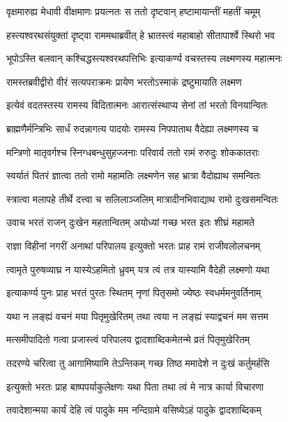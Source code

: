 \twolineshloka
{वृक्षमारुह्य मेधावी वीक्षमाणः प्रयत्नतः}
{स ततो दृष्टवान् हष्टामायान्तीं महतीं चमूम्} %

\twolineshloka
{हस्त्यश्वरथसंयुक्तां दृष्ट्वा राममथाब्रवीत्}
{हे भ्रातस्त्वं महाबाहो सीतापार्श्वे स्थिरो भव} %

\twolineshloka
{भूपोऽस्ति बलवान् कश्चिद्धस्त्यश्वरथपत्तिभिः}
{इत्याकर्ण्य वचस्तस्य लक्ष्मणस्य महात्मनः} %

\twolineshloka
{रामस्तब्रवीद्वीरो वीरं सत्यपराक्रमः}
{प्रायेण भरतोऽस्माकं द्रष्टुमायाति लक्ष्मण} %

\twolineshloka
{इत्येवं वदतस्तस्य रामस्य विदितात्मनः}
{आरात्संस्थाप्य सेनां तां भरतो विनयान्वितः} %

\twolineshloka
{ब्राह्मणैर्मन्त्रिभिः सार्धं रुदन्नागत्य पादयोः}
{रामस्य निपपाताथ वैदेह्या लक्ष्मणस्य च} %

\twolineshloka
{मन्त्रिणो मातृवर्गश्च स्निग्धबन्धुसुहज्जनाः}
{परिवार्य ततो रामं रुरुदुः शोककातराः} %

\twolineshloka
{स्वर्यातं पितरं ज्ञात्वा ततो रामो महामतिः}
{लक्ष्मणेन सह भ्रात्रा वैदोह्याथ समन्वितः} %

\twolineshloka
{स्त्रात्वा मलापहे तीर्थे दत्त्वा च सलिलाञ्जलिम्}
{मात्रादीनभिवाद्याथ रामो दुःखसमन्वितः} %

\twolineshloka
{उवाच भरतं राजन् दुःखेन महतान्वितम्}
{अयोध्यां गच्छ भरत इतः शीघ्रं महामते} %

\twolineshloka
{राज्ञा विहीनां नगरीं अनाथां परिपालय}
{इत्युक्तो भरतः प्राह रामं राजीवलोलचनम्} %

\twolineshloka
{त्वामृते पुरुषव्याघ्र न यास्येऽहमितो ध्रुवम्}
{यत्र त्वं तत्र यास्यामि वैदेही लक्ष्मणो यथा} %

\twolineshloka
{इत्याकर्ण्य पुनः प्राह भरतं पुरतः स्थितम्}
{नृणां पितृसमो ज्येष्ठः स्वधर्ममनुवर्तिनाम्} %

\twolineshloka
{यथा न लङ्ह्यं वचनं मया पितृमुखेरितम्}
{तथा त्वया न लङ्ह्यं स्याद्वचनं मम सत्तम} %

\twolineshloka
{मत्समीपादितो गत्वा प्रजास्त्वं परिपालय}
{द्वादशाब्दिकमेतन्मे व्रतं पितृमुखेरितम्} %

\twolineshloka
{तदरण्ये चरित्वा तु आगामिष्यामि तेऽन्तिकम्}
{गच्छ तिष्ठ ममादेशे न दुःखं कर्तुमर्हसि} %

\twolineshloka
{इत्युक्तो भरतः प्राह बाष्पपर्याकुलेक्षणः}
{यथा पिता तथा त्वं मे नात्र कार्या विचारणा} %

\twolineshloka
{तवादेशान्मया कार्यं देहि त्वं पादुके मम}
{नन्दिग्रामे वसिष्येऽहं पादुके द्वादशाब्दिकम्} %

